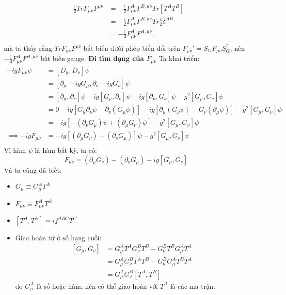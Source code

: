 \documentclass[14Pt]{report}
\begin{document}
	\begin{equation}
		\begin{split}
			-\frac{1}{2}TrF_{\mu\nu}F^{\mu\nu}	
			&=-\frac{1}{2}F_{\mu\nu}^AF^{B,\mu\nu}Tr\left[T^AT^B\right]\\
			&=-\frac{1}{2}F_{\mu\nu}^AF^{B,\mu\nu}Tr\frac{1}{2}\delta^{AB}\\
			&=-\frac{1}{4}F_{\mu\nu}^AF^{A,\mu\nu}.\\
		\end{split}
	\end{equation}
	mà ta thấy rằng $TrF_{\mu\nu}F^{\mu\nu}$ bất biến dưới phép biến đổi trên $F_{\mu\nu}'=S_GF_{\mu\nu}S_G^\dagger$, nên $-\frac{1}{4}F_{\mu\nu}^AF^{A,\mu\nu}$ bất biến gauge.
	\textbf{Đi tìm dạng của $F_{\mu\nu}$}
	Ta khai triển:
	\begin{equation}
		\begin{split}
			-igF_{\mu\nu}\psi&=\left[D_\mu,D_\nu\right]\psi\\
			&=\left[\partial_\mu-igG_\mu,\partial_\nu-igG_\nu\right]\psi\\
			&=\left[\partial_\mu,\partial_\nu\right]\psi-ig\left[G_\mu,\partial_\nu\right]\psi-ig\left[\partial_\mu,G_\nu\right]\psi-g^2\left[G_\mu,G_\nu\right]\psi\\
			&=0-ig\left[G_\mu\partial_\nu\psi-\partial_\nu(G_\mu\psi)\right]-ig\left[\partial_\mu(G_\nu\psi)-G_\nu(\partial_\mu\psi)\right]-g^2\left[G_\mu,G_\nu\right]\psi\\
			&=-ig\left[-(\partial_\nu G_\mu)\psi+(\partial_\mu G_\nu)\psi\right]-g^2\left[G_\mu,G_\nu\right]\psi\\
			\implies -igF_{\mu\nu}&=-ig\left[(\partial_\mu G_\nu)-(\partial_\nu G_\mu)\right]\psi-g^2\left[G_\mu,G_\nu\right]\psi\\
		\end{split}
	\end{equation}
	Vì hàm $\psi$ là hàm bất kỳ, ta có: 
	$$F_{\mu\nu}=(\partial_\mu G_\nu)-(\partial_\nu G_\mu)-ig\left[G_\mu,G_\nu\right]$$
	Và ta cũng đã biết:
	\begin{itemize}
		\item $G_\mu \equiv G_\mu^AT^A$
		\item $F_{\mu\nu} \equiv F_{\mu\nu}^AT^A$
		\item $\left[T^A,T^B\right]=if^{ABC}T^C$
		\item Giao hoán tử ở số hạng cuối:
		\begin{equation}
			\begin{split}
				\left[G_\mu,G_\nu\right]
				&=	G_\mu^AT^AG_\nu^BT^B-G_\nu^BT^B	G_\mu^AT^A\\
				&=G_\mu^AG_\nu^BT^AT^B-G_\nu^BG_\mu^AT^BT^A\\
				&=G_\mu^AG_\nu^B\left[T^A,T^B\right]
			\end{split}
		\end{equation}
		do $G_\mu^A$ là số hoặc hàm, nên có thể giao hoán với $T^A$ là các ma trận.
	\end{itemize}
\end{document}
